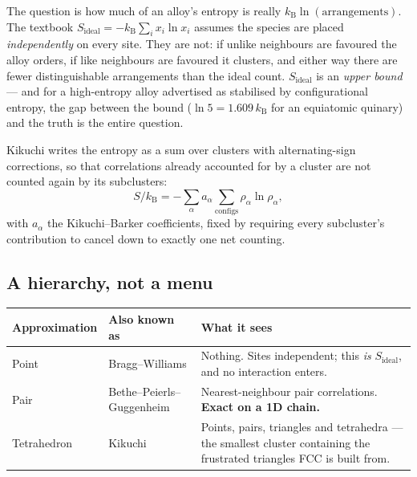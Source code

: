 The question is how much of an alloy's entropy is really
$k_\mathrm{B}\ln(\text{arrangements})$. The textbook
$S_\mathrm{ideal} = -k_\mathrm{B}\sum_i x_i\ln x_i$ assumes the species are
placed \emph{independently} on every site. They are not: if unlike neighbours are
favoured the alloy orders, if like neighbours are favoured it clusters, and
either way there are fewer distinguishable arrangements than the ideal count.
$S_\mathrm{ideal}$ is an \emph{upper bound} --- and for a high-entropy alloy
advertised as stabilised by configurational entropy, the gap between the bound
($\ln 5 = 1.609\,k_\mathrm{B}$ for an equiatomic quinary) and the truth is the
entire question.

Kikuchi writes the entropy as a sum over clusters with alternating-sign
corrections, so that correlations already accounted for by a cluster are not
counted again by its subclusters:
\begin{equation}
  S/k_\mathrm{B} = -\sum_\alpha a_\alpha
    \sum_{\text{configs}} \rho_\alpha \ln \rho_\alpha ,
\end{equation}
with $a_\alpha$ the Kikuchi--Barker coefficients, fixed by requiring every
subcluster's contribution to cancel down to exactly one net counting.

\subsection{A hierarchy, not a menu}

\begin{center}
\small
\begin{tabular}{@{}llp{6.4cm}@{}}
\toprule
Approximation & Also known as & What it sees \\
\midrule
Point       & Bragg--Williams          & Nothing. Sites independent; this
                                         \emph{is} $S_\mathrm{ideal}$, and no
                                         interaction enters. \\
Pair        & Bethe--Peierls--Guggenheim & Nearest-neighbour pair correlations.
                                         \textbf{Exact on a 1D chain.} \\
Tetrahedron & Kikuchi                  & Points, pairs, triangles and
                                         tetrahedra --- the smallest cluster
                                         containing the frustrated triangles FCC
                                         is built from. \\
\bottomrule
\end{tabular}
\end{center}

